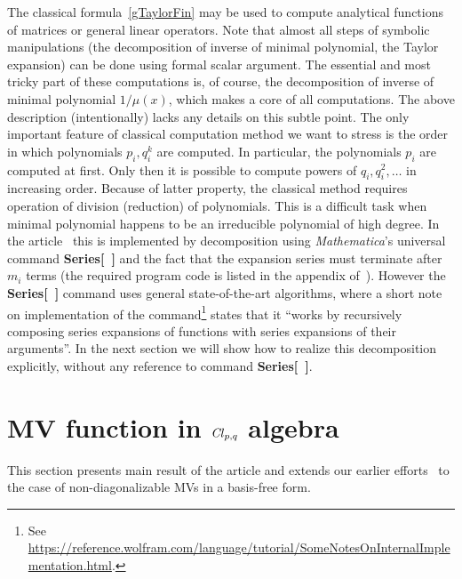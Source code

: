 \documentclass[AMA,STIX1COL]{WileyNJD-v2}
\newcommand{\cl}[2]{\ensuremath{\mathit{Cl}_{#1,#2}}}
\begin{document}
The classical formula~\eqref{gTaylorFin} may be used to compute
analytical functions of matrices or general linear
operators. Note that almost all steps of symbolic manipulations (the
decomposition of inverse of minimal polynomial, the
Taylor expansion) can be done using formal scalar
argument. The essential and most tricky part of these computations
is, of course, the decomposition of inverse of minimal polynomial
$1/ \mu(x)$, which makes a core of all computations. The above
description (intentionally) lacks any details on this subtle point.
The only important feature of classical computation method we want to stress is
the order in which polynomials $p_i, q_i^k$ are computed. In particular, the polynomials $p_i$ are computed at first.
Only then it is possible to compute powers of $q_i, q_i^2, \ldots$ in increasing order.
Because of latter property, the classical method requires operation of division (reduction) of polynomials.
This is a difficult task when minimal polynomial happens to be an irreducible
polynomial of high degree. In the article~\cite{Sobczyk1997} this is
implemented by decomposition using {\it Mathematica}'s universal command  {\bf Series[~]}
and the fact that the expansion series must terminate after $m_i$ terms (the required program code is listed in
the appendix of~\cite{Sobczyk1997}). However the {\bf Series[~]} command uses general state-of-the-art
algorithms, where a short note on implementation of the command\footnote{See
\url{https://reference.wolfram.com/language/tutorial/SomeNotesOnInternalImplementation.html}.}
states that it ``works by recursively composing series expansions of
functions with series expansions of their arguments''. In the next
section we will show how to realize this decomposition explicitly,
without any reference to  command {\bf Series[~]}.


\section{MV function in \cl{\lowercase{p}}{\lowercase{q}} algebra}
\label{sec:main}
This section presents main result of the article and extends our earlier
efforts~\cite{AcusLNCS2023,AcusMMAS2023} to the case of non-diagonalizable MVs in a basis-free form.
\end{document}
